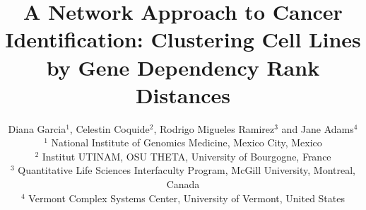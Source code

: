 \documentclass[12pt]{article}
\begin{document}
\title{\normalsize\bf \vspace{-8ex}
A Network Approach to Cancer Identification: Clustering Cell Lines by Gene Dependency Rank Distances}

\author{Diana Garcia$^1$, Celestin Coquide$^2$, Rodrigo Migueles Ramirez$^3$ and Jane Adams$^4$\\
$^1$ National Institute of Genomics Medicine, Mexico City, Mexico\\ 
$^2$ Institut UTINAM, OSU THETA, University of Bourgogne, France\\
$^3$ Quantitative Life Sciences Interfaculty Program, McGill University, Montreal, Canada\\
$^4$ Vermont Complex Systems Center, University of Vermont, United States}


\date{\vspace{-5ex}} %

\maketitle

\thispagestyle{empty}
\pagestyle{empty}
\end{document}
